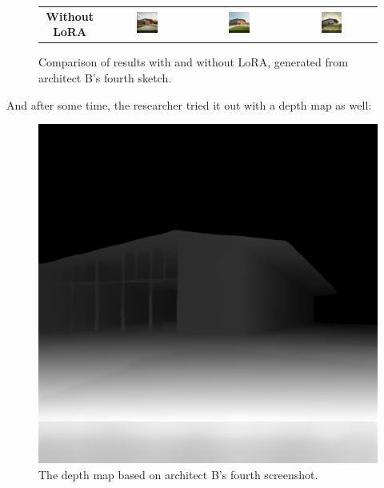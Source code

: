 \begin{figure}[H]
{\begin{tabular}{c c c c}
    \textbf{Without LoRA} &
    \includegraphics[width=0.25\textwidth]{Images/Results/Architect-B_unstructured-phase/generated_images/4/Zonder_lora_00021_.png} &
    \includegraphics[width=0.25\textwidth]{Images/Results/Architect-B_unstructured-phase/generated_images/4/Zonder_lora_00022_.png} & \includegraphics[width=0.25\textwidth]{Images/Results/Architect-B_unstructured-phase/generated_images/4/Zonder_lora_00023_.png} \\
  \end{tabular}
  }
  \caption{Comparison of results with and without LoRA, generated from architect B's fourth sketch.}
  \label{fig:lora-comparison-2wide}
\end{figure}

And after some time, the researcher tried it out with a depth map as well:
\begin{figure}
    \centering
    \includegraphics[width=0.3\linewidth]{Images/Results/Architect-B_unstructured-phase/screenshots/screenshot_4_preprocessed_2.png}
    \caption{The depth map based on architect B's fourth screenshot.}
    \label{fig:B-screenshot-4-2}
\end{figure}

